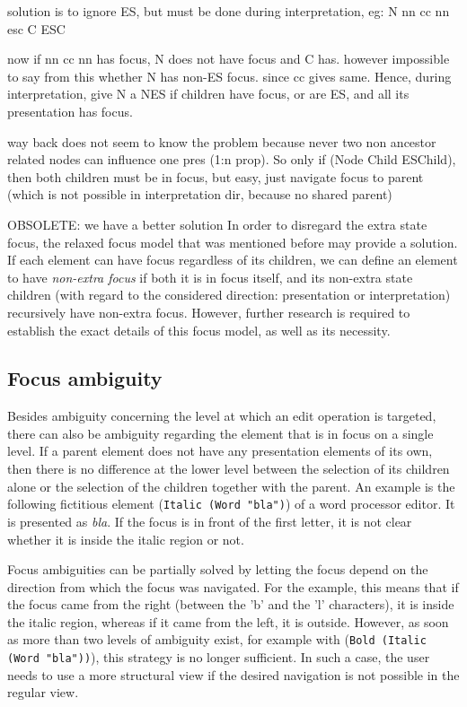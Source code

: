 \bc
solution is to ignore ES, but must be done during interpretation, eg:
  N       nn cc nn esc
C ESC 

now if nn cc nn has focus, N does not have focus and C has. however impossible to say from this whether N has non-ES focus. since cc gives same. Hence, during interpretation, give N a NES if children have focus, or are ES, and all its presentation has focus.
\ec

\bc
way back does not seem to know the problem because never two non ancestor related nodes can influence one pres (1:n prop). So only if (Node Child ESChild), then both children must be in focus, but easy, just navigate focus to parent (which is not possible in interpretation dir, because no shared parent)
\ec

\bc OBSOLETE: we have a better solution
In order to disregard the extra state focus, the relaxed focus model that was mentioned before may provide a solution. If each element can have focus regardless of its children, we can define an element to have {\em non-extra focus} if both it is in focus itself, and its non-extra state children (with regard to the considered direction: presentation or interpretation) recursively have non-extra focus. However, further research is required to establish the exact details of this focus model, as well as its necessity.
\ec

%																
\subsection{Focus ambiguity}

Besides ambiguity concerning the level at which an edit operation is targeted, there can also be  ambiguity regarding the element that is in focus on a single level. If a parent element does not have any presentation elements of its own, then there is no difference at the lower level between the selection of its children alone or the selection of the children together with the parent. An example is the following fictitious element (\verb|Italic (Word "bla")|) of a word processor editor. It is presented as {\it bla}. If the focus is in front of the first letter, it is not clear whether it is inside the italic region or not. 

Focus ambiguities can be partially solved by letting the focus depend on the direction from which the focus was navigated. For the example, this means that if the focus came from the right (between the 'b' and the 'l' characters), it is inside the italic region, whereas if it came from the left, it is outside. However, as soon as more than two levels of ambiguity exist, for example with (\verb|Bold (Italic (Word "bla"))|), this strategy is no longer sufficient. In such a case, the user needs to use a more structural view if the desired navigation is not possible in the regular view.


